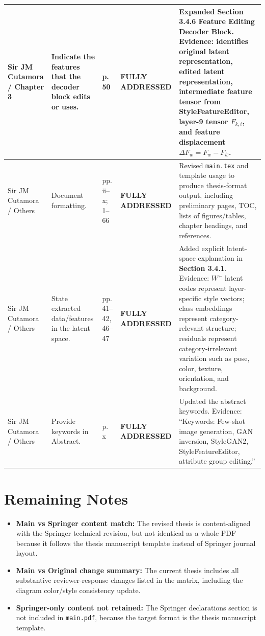 \documentclass[11pt]{article}
\newcommand{\full}{\textbf{\textcolor{green!45!black}{FULLY ADDRESSED}}}
\begin{document}
\begin{longtable}{|p{}|p{}|p{}|p{}|p{}|}
Sir JM Cutamora / Chapter 3
& Indicate the features that the decoder block edits or uses.
& p. 50
& \full
& Expanded \textbf{Section 3.4.6 Feature Editing Decoder Block}. Evidence: identifies original latent representation, edited latent representation, intermediate feature tensor from StyleFeatureEditor, layer-9 tensor $F_{k,i}$, and feature displacement $\Delta F_w = F_w - F_{\hat{w}}$.\\
\hline

Sir JM Cutamora / Others
& Document formatting.
& pp. ii--x; 1--66
& \full
& Revised \texttt{main.tex} and template usage to produce thesis-format output, including preliminary pages, TOC, lists of figures/tables, chapter headings, and references.\\
\hline

Sir JM Cutamora / Others
& State extracted data/features in the latent space.
& pp. 41--42, 46--47
& \full
& Added explicit latent-space explanation in \textbf{Section 3.4.1}. Evidence: $W^{+}$ latent codes represent layer-specific style vectors; class embeddings represent category-relevant structure; residuals represent category-irrelevant variation such as pose, color, texture, orientation, and background.\\
\hline

Sir JM Cutamora / Others
& Provide keywords in Abstract.
& p. x
& \full
& Updated the abstract keywords. Evidence: ``Keywords: Few-shot image generation, GAN inversion, StyleGAN2, StyleFeatureEditor, attribute group editing.''\\
\hline

\end{longtable}

\section*{Remaining Notes}

\begin{itemize}[leftmargin=*]
    \item \textbf{Main vs Springer content match:} The revised thesis is content-aligned with the Springer technical revision, but not identical as a whole PDF because it follows the thesis manuscript template instead of Springer journal layout.
    \item \textbf{Main vs Original change summary:} The current thesis includes all substantive reviewer-response changes listed in the matrix, including the diagram color/style consistency update.
    \item \textbf{Springer-only content not retained:} The Springer declarations section is not included in \texttt{main.pdf}, because the target format is the thesis manuscript template.
\end{itemize}
\end{document}

